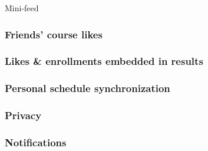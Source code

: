   Mini-feed

  \subsubsection{Friends' course likes}

  \subsubsection{Likes \& enrollments embedded in results}

  \subsubsection{Personal schedule synchronization}

  \subsubsection{Privacy}

  \subsubsection{Notifications}


